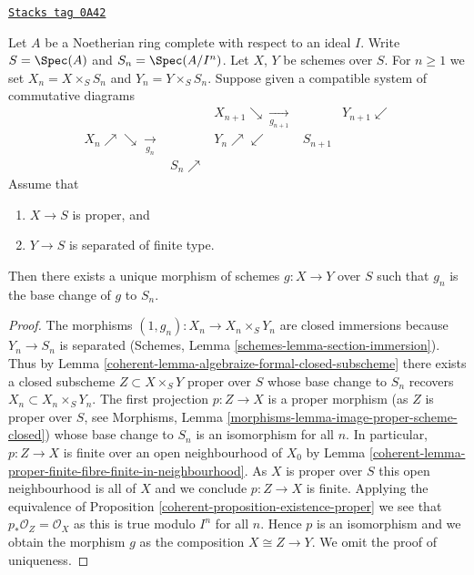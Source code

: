 \begin{lemma}
\label{coherent-lemma-algebraize-morphism}
\href{https://stacks.math.columbia.edu/tag/0A42}{\texttt{Stacks tag 0A42}}

Let $A$ be a Noetherian ring complete with respect to an ideal $I$.
Write $S = \Spec(A)$ and $S_n = \Spec(A/I^n)$. Let $X$, $Y$ be schemes
over $S$. For $n \geq 1$ we set $X_n = X \times_S S_n$ and
$Y_n = Y \times_S S_n$. Suppose given a compatible system of
commutative diagrams
$$
\begin{array}{ccccc} &  & X_{n + 1} \searrow\underset{g_{n + 1}}{\longrightarrow} &  & Y_{n + 1} \swarrow \\ X_n \nearrow\searrow\underset{g_n}{\longrightarrow} &  & Y_n \nearrow\swarrow & S_{n + 1} &  \\  & S_n \nearrow &  &  & \end{array}
$$
Assume that
\begin{enumerate}
\item $X \to S$ is proper, and
\item $Y \to S$ is separated of finite type.
\end{enumerate}
Then there exists a unique morphism of schemes $g : X \to Y$
over $S$ such that $g_n$ is the base change of $g$ to $S_n$.
\end{lemma}

\begin{proof}

The morphisms $(1, g_n) : X_n \to X_n \times_S Y_n$ are closed immersions
because $Y_n \to S_n$ is separated
(Schemes, Lemma \ref{schemes-lemma-section-immersion}). Thus by
Lemma \ref{coherent-lemma-algebraize-formal-closed-subscheme}
there exists a closed subscheme $Z \subset X \times_S Y$
proper over $S$ whose base change to $S_n$ recovers
$X_n \subset X_n \times_S Y_n$. The first projection $p : Z \to X$
is a proper morphism (as $Z$ is proper over $S$, see
Morphisms, Lemma \ref{morphisms-lemma-image-proper-scheme-closed})
whose base change to $S_n$ is an isomorphism
for all $n$. In particular, $p : Z \to X$ is finite over an open
neighbourhood of $X_0$ by
Lemma \ref{coherent-lemma-proper-finite-fibre-finite-in-neighbourhood}.
As $X$ is proper over $S$ this open neighbourhood is all of $X$
and we conclude $p : Z \to X$ is finite.
Applying the equivalence of Proposition \ref{coherent-proposition-existence-proper}
we see that $p_*\mathcal{O}_Z = \mathcal{O}_X$ as this is true
modulo $I^n$ for all $n$. Hence $p$ is an isomorphism and we obtain
the morphism $g$ as the composition $X \cong Z \to Y$.
We omit the proof of uniqueness.
\end{proof}

